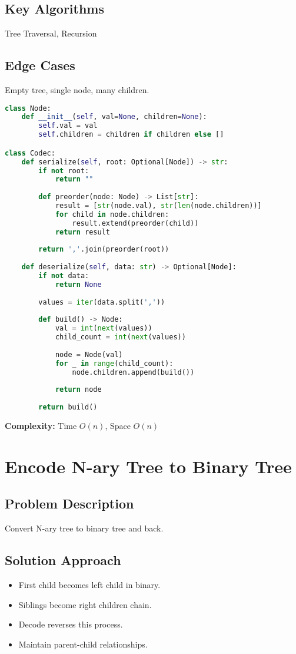 \documentclass[10pt, a4paper]{article}
\begin{document}
\subsection*{Key Algorithms}
Tree Traversal, Recursion

\subsection*{Edge Cases}
Empty tree, single node, many children.

\begin{lstlisting}[language=Python]
class Node:
    def __init__(self, val=None, children=None):
        self.val = val
        self.children = children if children else []

class Codec:
    def serialize(self, root: Optional[Node]) -> str:
        if not root:
            return ""
        
        def preorder(node: Node) -> List[str]:
            result = [str(node.val), str(len(node.children))]
            for child in node.children:
                result.extend(preorder(child))
            return result
        
        return ','.join(preorder(root))
    
    def deserialize(self, data: str) -> Optional[Node]:
        if not data:
            return None
        
        values = iter(data.split(','))
        
        def build() -> Node:
            val = int(next(values))
            child_count = int(next(values))
            
            node = Node(val)
            for _ in range(child_count):
                node.children.append(build())
            
            return node
        
        return build()
\end{lstlisting}
\textbf{Complexity:} Time $O(n)$, Space $O(n)$

\section{Encode N-ary Tree to Binary Tree}
\subsection*{Problem Description}
Convert N-ary tree to binary tree and back.

\subsection*{Solution Approach}
\begin{itemize}
    \item First child becomes left child in binary.
    \item Siblings become right children chain.
    \item Decode reverses this process.
    \item Maintain parent-child relationships.
\end{itemize}
\end{document}
